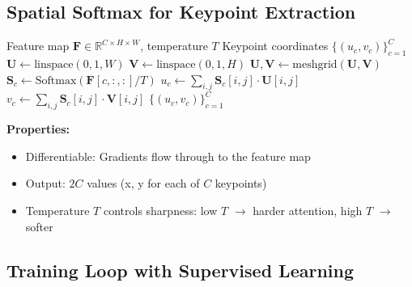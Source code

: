 \subsection{Spatial Softmax for Keypoint Extraction}

\begin{algorithm}[H]
\caption{Spatial Softmax Keypoint Extraction}
\label{alg:spatial_softmax}
\begin{algorithmic}[1]
\REQUIRE Feature map $\mathbf{F} \in \mathbb{R}^{C \times H \times W}$, temperature $T$
\ENSURE Keypoint coordinates $\{(u_c, v_c)\}_{c=1}^C$
\STATE {}
\STATE $\mathbf{U} \gets \text{linspace}(0, 1, W)$ 
\STATE $\mathbf{V} \gets \text{linspace}(0, 1, H)$ 
\STATE $\mathbf{U}, \mathbf{V} \gets \text{meshgrid}(\mathbf{U}, \mathbf{V})$ 
\STATE
{}
    \STATE {}
    \STATE $\mathbf{S}_c \gets \text{Softmax}(\mathbf{F}[c, :, :] / T)$ 
    \STATE
    \STATE {}
    \STATE $u_c \gets \sum_{i,j} \mathbf{S}_c[i, j] \cdot \mathbf{U}[i, j]$
    \STATE $v_c \gets \sum_{i,j} \mathbf{S}_c[i, j] \cdot \mathbf{V}[i, j]$
\ENDFOR
\RETURN $\{(u_c, v_c)\}_{c=1}^C$
\end{algorithmic}
\end{algorithm}

\textbf{Properties:}
\begin{itemize}
    \item Differentiable: Gradients flow through to the feature map
    \item Output: $2C$ values (x, y for each of $C$ keypoints)
    \item Temperature $T$ controls sharpness: low $T$ $\rightarrow$ harder attention, high $T$ $\rightarrow$ softer
\end{itemize}

\subsection{Training Loop with Supervised Learning}

